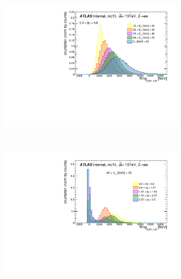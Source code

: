 
\begin{figure}[h!t]
\centering
\begin{subfigure}[c]{.6\textwidth}
\centering
\includegraphics[width=\textwidth]{sections/ringer/figures/L2Calo_ring_9_eta0_etComp.pdf}
\centering
\caption{}%
\end{subfigure} \\
\begin{subfigure}[c]{.6\textwidth}
\centering
\includegraphics[width=\textwidth]{sections/ringer/figures/L2Calo_ring_9_et3_etaComp.pdf}
\caption{}%
\end{subfigure} 


\end{figure}
